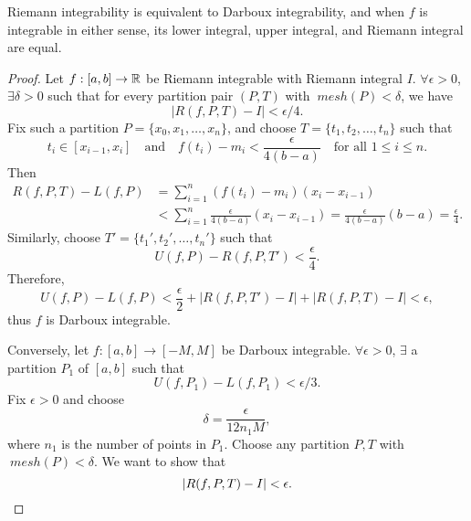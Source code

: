 \begin{thm}
    Riemann integrability is equivalent to Darboux integrability, and when $f$ is integrable in either sense, its lower integral, upper integral, and Riemann integral are equal.
    \begin{proof}
        Let $f: [a, b] \to {\mathbb R}$ be Riemann integrable with Riemann integral $I$. $\forall \epsilon > 0$, $\exists \delta > 0$ such that for every partition pair $(P, T)$ with $~mesh(P) < \delta$, we have
        \[
        |R(f, P, T) - I| < \epsilon/4.
        \]
        Fix such a partition $P = \{x_0, x_1, \ldots, x_n\}$, and choose $T = \{t_1, t_2, \ldots, t_n\}$ such that
        \[
        t_i \in [x_{i-1}, x_i] \quad \text{and} \quad f(t_i) - m_i < \frac{\epsilon}{4(b - a)} \quad \text{for all } 1 \leq i \leq n.
        \]
        Then
        \begin{align*}
            R(f, P, T) - L(f, P) &= \sum_{i=1}^n (f(t_i) - m_i)(x_i - x_{i-1}) \\
            &< \sum_{i=1}^n \frac{\epsilon}{4(b - a)} (x_i - x_{i-1}) = \frac{\epsilon}{4(b - a)} (b - a) = \frac{\epsilon}{4}.
        \end{align*}
        Similarly, choose $T' = \{t_1', t_2', \ldots, t_n'\}$ such that
        \[
        U(f, P) - R(f, P, T') < \frac{\epsilon}{4}.
        \]
        Therefore,
        \[
        U(f, P) - L(f, P) < \frac{\epsilon}{2} + |R(f, P, T') - I| + |R(f, P, T) - I| < \epsilon,
        \]
        thus $f$ is Darboux integrable.

        Conversely, let $f: [a, b] \to [-M, M]$ be Darboux integrable. $\forall \epsilon > 0$, $\exists$ a partition $P_1$ of $[a, b]$ such that
        \[
        U(f, P_1) - L(f, P_1) < \epsilon/3.
        \]
        Fix $\epsilon > 0$ and choose
        \[
        \delta = \frac{\epsilon}{12 n_1 M},
        \]
        where $n_1$ is the number of points in $P_1$. Choose any partition $P, T$ with $~mesh (P) < \delta$. We want to show that
        \[
        {\left| R(f, P, T) - I \right|} < \epsilon.
        \]


\end{proof}
\end{thm}
